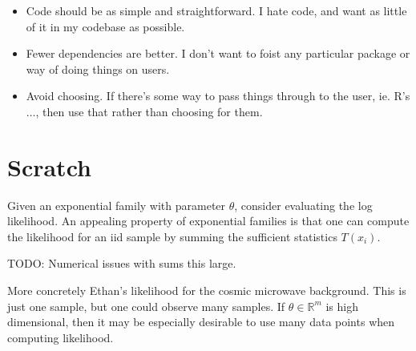 \documentclass[12pt]{article}
\begin{document}
\begin{itemize}
    \item Code should be as simple and straightforward. I hate code, and want as
        little of it in my codebase as possible.
    \item Fewer dependencies are better. I don't want to foist any
        particular package or way of doing things on users.
    \item Avoid choosing. If there's some way to pass things through to the
        user, ie. R's $\dots$, then use that rather than choosing for them.
\end{itemize}

\section{Scratch}

Given an exponential family with parameter $\theta$, consider evaluating
the log likelihood. An appealing property of exponential families is that
one can compute the likelihood for an iid sample by summing the
sufficient statistics $T(x_i)$.

TODO: Numerical issues with sums this large.

More concretely Ethan's likelihood for the cosmic microwave background. 
This is just one sample, but one could observe many samples.
If $\theta \in \mathbb{R}^m$ is high dimensional, then it may be
especially desirable to use many data points when computing likelihood.




 
\end{document}
